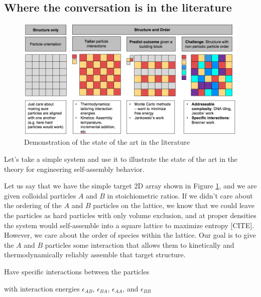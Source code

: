 \subsection{Where the conversation is in the literature}

\begin{figure}[h]
\begin{center}
\includegraphics[width=6.5in]{../figures/litreview.png}
\caption{Demonstration of the state of the art in the literature}
\label{fig:litreview}
\end{center}
\end{figure}

Let's take a simple system and use it to illustrate the state of the art in the theory for engineering self-assembly behavior.

Let us say that we have the simple target 2D array shown in Figure \ref{fig:litreview}, and we are given colloidal particles $A$ and $B$ in stoichiometric ratios.
If we didn't care about the ordering of the $A$ and $B$ particles on the lattice, we know that we could leave the particles as hard particles with only volume exclusion, and at proper densities the system would self-assemble into a square lattice to maximize entropy [CITE].
However, we care about the order of species within the lattice.
Our goal is to give the $A$ and $B$ particles some interaction that allows them to kinetically and thermodynamically reliably assemble that target structure.

Have specific interactions between the particles

with interaction energies $\epsilon_{AB}$, $\epsilon_{BA}$, $\epsilon_{AA}$, and $\epsilon_{BB}$



